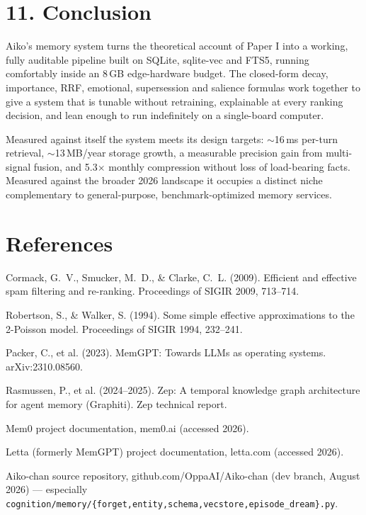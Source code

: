 \documentclass[]{article}
\begin{document}
\hypertarget{conclusion}{%
\section{\texorpdfstring{\textbf{11.
Conclusion}}{11. Conclusion}}\label{conclusion}}

Aiko's memory system turns the theoretical account of Paper I into a
working, fully auditable pipeline built on SQLite, sqlite-vec and FTS5,
running comfortably inside an 8\,GB edge-hardware budget. The closed-form
decay, importance, RRF, emotional, supersession and salience formulas
work together to give a system that is tunable without retraining,
explainable at every ranking decision, and lean enough to run indefinitely
on a single-board computer.

Measured against itself the system meets its design targets:
\(\sim\)16\,ms per-turn retrieval, \(\sim\)13\,MB/year storage growth, a
measurable precision gain from multi-signal fusion, and 5.3\(\times\) monthly
compression without loss of load-bearing facts. Measured against the
broader 2026 landscape it occupies a distinct niche complementary to
general-purpose, benchmark-optimized memory services.

\hypertarget{references}{%
\section{\texorpdfstring{\textbf{References}}{References}}\label{references}}

Cormack, G.\ V., Smucker, M.\ D., \& Clarke, C.\ L. (2009). Efficient and
effective spam filtering and re-ranking. Proceedings of SIGIR 2009,
713--714.

Robertson, S., \& Walker, S. (1994). Some simple effective approximations
to the 2-Poisson model. Proceedings of SIGIR 1994, 232--241.

Packer, C., et al. (2023). MemGPT: Towards LLMs as operating systems.
arXiv:2310.08560.

Rasmussen, P., et al. (2024--2025). Zep: A temporal knowledge graph
architecture for agent memory (Graphiti). Zep technical report.

Mem0 project documentation, mem0.ai (accessed 2026).

Letta (formerly MemGPT) project documentation, letta.com (accessed 2026).

Aiko-chan source repository, github.com/OppaAI/Aiko-chan (dev branch,
August 2026) --- especially \texttt{cognition/memory/\{forget,entity,schema,vecstore,episode\_dream\}.py}.
\end{document}
